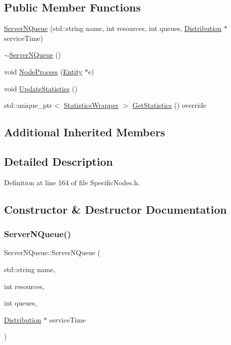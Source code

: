 \subsection*{Public Member Functions}
\begin{DoxyCompactItemize}
\item 
\hyperlink{class_server_n_queue_a7d669a398b47382358b2cd7b28e6012a}{Server\+N\+Queue} (std\+::string name, int resources, int queues, \hyperlink{class_distribution}{Distribution} $\ast$service\+Time)
\item 
\hyperlink{class_server_n_queue_ab13c0aee5829a612bf6bda12c82ad6b7}{$\sim$\+Server\+N\+Queue} ()
\item 
void \hyperlink{class_server_n_queue_adbc0e634171f6dc0785f2e49659663f7}{Node\+Process} (\hyperlink{class_entity}{Entity} $\ast$e)
\item 
void \hyperlink{class_server_n_queue_a08260b431df7adc0495f2e6c1d3ff33f}{Update\+Statistics} ()
\item 
std\+::unique\+\_\+ptr$<$ \hyperlink{class_generic_node_1_1_statistics_wrapper}{Statistics\+Wrapper} $>$ \hyperlink{class_server_n_queue_a18718f3796f33fa0f9d9100c34a6a7dc}{Get\+Statistics} () override
\end{DoxyCompactItemize}
\subsection*{Additional Inherited Members}


\subsection{Detailed Description}


Definition at line 164 of file Specific\+Nodes.\+h.



\subsection{Constructor \& Destructor Documentation}
\mbox{\label{class_server_n_queue_a7d669a398b47382358b2cd7b28e6012a}} 
\subsubsection{\texorpdfstring{Server\+N\+Queue()}{ServerNQueue()}}
{\footnotesize\ttfamily Server\+N\+Queue\+::\+Server\+N\+Queue (\begin{DoxyParamCaption}\item[{std\+::string}]{name,  }\item[{int}]{resources,  }\item[{int}]{queues,  }\item[{\hyperlink{class_distribution}{Distribution} $\ast$}]{service\+Time }\end{DoxyParamCaption})}



